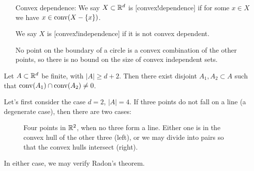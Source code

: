 \begin{itemize}[]
\item[Convex dependence:]We say $X\subset \mathbb{R}^d$  is [convex!dependence] if for some $x\in X$ we have $x\in \operatorname{conv}(X- \{x\})$. 

We say $X$ is [convex!independence] if it is not convex dependent.

\begin{remark}
No point on the boundary of a circle is a convex combination of the other points, so there is no bound on the size of convex independent sets.
\end{remark}

\end{itemize}


\begin{theorem} 
Let $A\subset \mathbb{R}^d$ be finite, with $|A| \geq d+2$. Then there exist disjoint $A_1,A_2\subset A$ such that $\operatorname{conv}(A_1)\cap \operatorname{conv}(A_2)\neq 0$.

\end{theorem}
\begin{remark}
Let's first consider the case $d=2$, $|A| =4$. If three points do not fall on a line (a degenerate case), then there are two cases: 
\begin{figure}
\hfill
{}
\hfill
{}
\hfill
\caption{Four points in $\mathbb{R}^2$, when no three form a line. Either one is in the convex hull of the other three (left), or we may divide into pairs so that the convex hulls intersect (right).}\label{fig:Radon_example_d2}
\end{figure}
In either case, we may verify Radon's theorem.
\end{remark}

